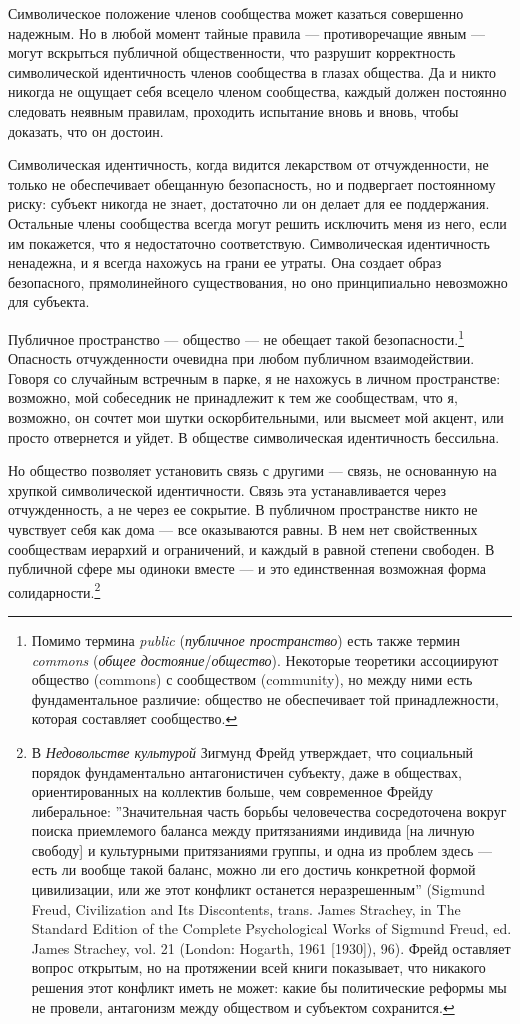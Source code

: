 \documentclass[12pt]{book}
\begin{document}
Символическое положение членов сообщества может казаться совершенно надежным. Но в любой момент тайные правила --- противоречащие явным --- могут вскрыться публичной общественности, что разрушит корректность символической идентичность членов сообщества в глазах общества. Да и никто никогда не ощущает себя всецело членом сообщества, каждый должен постоянно следовать неявным правилам, проходить испытание вновь и вновь, чтобы доказать, что он достоин.

Символическая идентичность, когда видится лекарством от отчужденности, не только не обеспечивает обещанную безопасность, но и подвергает постоянному риску: субъект никогда не знает, достаточно ли он делает для ее поддержания. Остальные члены сообщества всегда могут решить исключить меня из него, если им покажется, что я недостаточно соответствую. Символическая идентичность ненадежна, и я всегда нахожусь на грани ее утраты. Она создает образ безопасного, прямолинейного существования, но оно принципиально невозможно для субъекта.

Публичное пространство --- общество --- не обещает такой безопасности.\footnote{Помимо термина \textit{public} (\textit{публичное пространство}) есть также термин \textit{commons} (\textit{общее достояние}/\textit{общество}). Некоторые теоретики ассоциируют общество (commons) с сообществом (community), но между ними есть фундаментальное различие: общество не обеспечивает той принадлежности, которая составляет сообщество.} Опасность отчужденности очевидна при любом публичном взаимодействии. Говоря со случайным встречным в парке, я не нахожусь в личном пространстве: возможно, мой собеседник не принадлежит к тем же сообществам, что я, возможно, он сочтет мои шутки оскорбительными, или высмеет мой акцент, или просто отвернется и уйдет. В обществе символическая идентичность бессильна.

Но общество позволяет установить связь с другими --- связь, не основанную на хрупкой символической идентичности. Связь эта устанавливается через отчужденность, а не через ее сокрытие. В публичном пространстве никто не чувствует себя как дома --- все оказываются равны. В нем нет свойственных сообществам иерархий и ограничений, и каждый в равной степени свободен. В публичной сфере мы одиноки вместе --- и это единственная возможная форма солидарности.\footnote{В \textit{Недовольстве культурой} Зигмунд Фрейд утверждает, что социальный порядок фундаментально антагонистичен субъекту, даже в обществах, ориентированных на коллектив больше, чем современное Фрейду либеральное: ''Значительная часть борьбы человечества сосредоточена вокруг поиска приемлемого баланса между притязаниями индивида [на личную свободу] и культурными притязаниями группы, и одна из проблем здесь --- есть ли вообще такой баланс, можно ли его достичь конкретной формой цивилизации, или же этот конфликт останется неразрешенным'' (Sigmund Freud, Civilization and Its Discontents, trans. James Strachey, in The Standard Edition of the Complete Psychological Works of Sigmund Freud, ed. James Strachey, vol. 21 (London: Hogarth, 1961 [1930]), 96). Фрейд оставляет вопрос открытым, но на протяжении всей книги показывает, что никакого решения этот конфликт иметь не может: какие бы политические реформы мы не провели, антагонизм между обществом и субъектом сохранится.}
\end{document}
